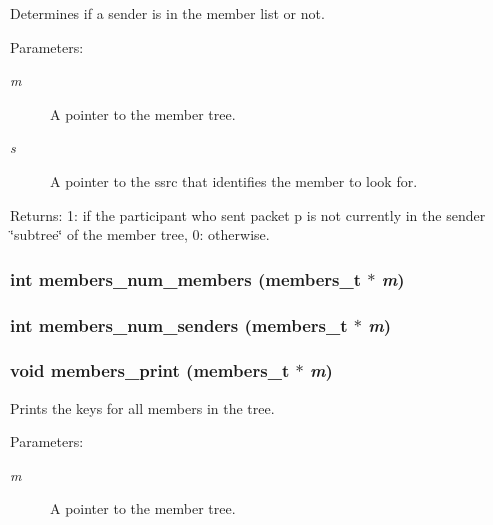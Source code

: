 Determines if a sender is in the member list or not. \begin{Desc}
\item[Parameters:]
\begin{description}
\item[{\em m}]A pointer to the member tree. \item[{\em s}]A pointer to the ssrc that identifies the member to look for. \end{description}
\end{Desc}
\begin{Desc}
\item[Returns:]1: if the participant who sent packet p is not currently in the sender \char`\"{}subtree\char`\"{} of the member tree, 0: otherwise. \end{Desc}
\subsubsection{\setlength{\rightskip}{0pt plus 5cm}int members\_\-num\_\-members ({\bf members\_\-t} $\ast$ {\em m})}\label{members_8h_a10}


\subsubsection{\setlength{\rightskip}{0pt plus 5cm}int members\_\-num\_\-senders ({\bf members\_\-t} $\ast$ {\em m})}\label{members_8h_a11}


\subsubsection{\setlength{\rightskip}{0pt plus 5cm}void members\_\-print ({\bf members\_\-t} $\ast$ {\em m})}\label{members_8h_a12}


Prints the keys for all members in the tree. \begin{Desc}
\item[Parameters:]
\begin{description}
\item[{\em m}]A pointer to the member tree. \end{description}
\end{Desc}
